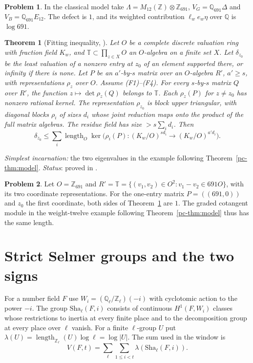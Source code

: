 \documentclass[reqno]{amsart}
\theoremstyle{definition}
\newtheorem{problem}{Problem}[section]
\theoremstyle{plain}
\newtheorem{theorem}{Theorem}[section]
\newcommand{\Z}{\mathbb Z}
\newcommand{\Q}{\mathbb Q}
\newcommand{\Sha}{\mathrm{Sha}}
\newcommand{\len}{\operatorname{length}}
\begin{document}
\begin{problem}\label{pr:691}
In the classical model take \(\Lambda=M_{12}(\Z)\otimes\Z_{691}\), \(V_G=\Q_{691}\Delta\) and \(V_B=\Q_{691}E_{12}\).  The defect is \(1\), and its weighted contribution \(\ell_we_w\eta\) over \(\Q\) is \(\log691\).
\end{problem}

\begin{theorem}[Fitting inequality, {\cite[Prop.~17.27]{Adr}}]\label{thm:fitting}
Let \(O\) be a complete discrete valuation ring with fraction field \(K_w\), and \(\mathbb T\subset\prod_{z\in X}  O\) an \(O\)-algebra on a finite set \(X\).  Let \(\delta_{z_0}\) be the least valuation of a nonzero entry at \(z_0\) of an element supported there, or infinity if there is none.  Let \(P\) be an \(a'\)-by-\(s\) matrix over an \(O\)-algebra \(R'\), \(a'\ge s\), with representations \(\rho_z\) over \(O\).
Assume (F1)--(F4).  For every \(s\)-by-\(s\) matrix \(Q\) over \(R'\), the function \(z\mapsto\det\rho_z(Q)\) belongs to \(\mathbb T\).  Each \(\rho_z(P)\) for \(z\ne z_0\) has nonzero rational kernel.  The representation \(\rho_{z_0}\) is block upper triangular, with diagonal blocks \(\rho_i\) of sizes \(d_i\) whose joint reduction maps onto the product of the full matrix algebras.  The residue field has size \(>s\sum_i d_i\).  Then
\[
 \delta_{z_0}\le\sum_i\len_O\ker\bigl(\rho_i(P):(K_w/O)^{sd_i}\longrightarrow(K_w/O)^{a'd_i}\bigr).
\]
\end{theorem}
\noindent\emph{Simplest incarnation:} the two eigenvalues in the example following Theorem~\ref{pc-thm:model}. \emph{Status}: proved in \cite{Adr}.

\begin{problem}\label{pr:fitting}
Let \(O=\Z_{691}\) and \(R'=\mathbb T=\{(v_1,v_2)\in O^2:v_1-v_2\in691O\}\), with its two coordinate representations.  For the one-entry matrix \(P=((691,0))\) and \(z_0\) the first coordinate, both sides of Theorem~\ref{thm:fitting} are \(1\).  The graded cotangent module in the weight-twelve example following Theorem~\ref{pc-thm:model} thus has the same length.
\end{problem}

\section{Strict Selmer groups and the two signs}\label{sec:selmer}
For a number field \(F\) use \(W_i=(\Q_\ell/\Z_\ell)(-i)\) with cyclotomic action to the power \(-i\).  The group \(\Sha_\ell(F,i)\) consists of continuous \(H^1(F,W_i)\) classes whose restrictions to inertia at every finite place and to the decomposition group at every place over \(\ell\) vanish.  For a finite \(\ell\)-group \(U\) put \(\lambda(U)=\len_{\Z_\ell}(U)\log\ell=\log|U|\).  The sum used in the window \cite[Def.~17.2, Hyp.~17.11]{Adr} is
\[
 V(F,t)=\sum_{\ell}\sum_{1\le i<t}\lambda(\Sha_\ell(F,i)).
\]
\end{document}
